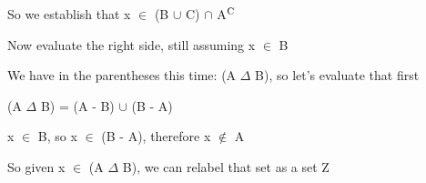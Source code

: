 \documentclass{article}
\begin{document}
\noindent So we establish that x $\in$ (B $\cup$ C) $\cap$ A$\textsuperscript{C}$ \vspace{0.5cm}

\noindent Now evaluate the right side, still assuming x $\in$ B \vspace{0.5cm}

\noindent We have in the parentheses this time: (A $\Delta$ B), so let's evaluate that first \vspace{0.5cm}

\noindent (A $\Delta$ B) = (A - B) $\cup$ (B - A) \vspace{0.5cm}

\noindent x $\in$ B, so x $\in$ (B - A), therefore x $\not\in$ A \vspace{0.5cm}

\noindent So given x $\in$ (A $\Delta$ B), we can relabel that set as a set Z \vspace{0.5cm}
\end{document}
